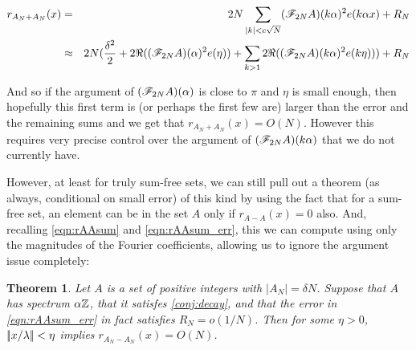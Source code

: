 \documentclass{report}
\newtheorem{theorem}{Theorem}[section]
\theoremstyle{remark}
\numberwithin{equation}{section}
\begin{document}
\begin{eqnarray*}
  r_{A_N + A_N}(x) &=& 2N \sum_{|k| < c\sqrt{N}}
                       (\mathscr{F}_{2N}A)(k\alpha)^2 e(k\alpha x) + R_N\\
                   &\approx& 2N (\frac{\delta^2}{2} +
                             2\Re((\mathscr{F}_{2N}A)(\alpha)^2 e(\eta)) + \sum_{k > 1}
                             2\Re((\mathscr{F}_{2N}A)(k\alpha)^2 e(k\eta))) + R_N\\
\end{eqnarray*}

And so if the argument of $(\mathscr{F}_{2N}A)(\alpha)$ is close to $\pi$ and
$\eta$ is small enough, then hopefully this first term is (or perhaps
the first few are) larger than the error and the remaining sums and we
get that $r_{A_N + A_N}(x) = O(N)$.  However this requires very
precise control over the argument of $(\mathscr{F}_{2N}A)(k\alpha)$ that we
do not currently have.

However, at least for truly sum-free sets, we can still pull out a
theorem (as always, conditional on small error) of this kind by using
the fact that for a sum-free set, an element can be in the set $A$
only if $r_{A-A}(x) = 0$ also.  And, recalling \ref{eqn:rAAsum} and
\ref{eqn:rAAsum_err}, this we can compute using only the magnitudes of
the Fourier coefficients, allowing us to ignore the argument issue
completely: 

\begin{theorem}\label{thm:hole1}
  Let $A$ is a \relevant set of positive integers with
  $|A_N| = \delta N$.  Suppose that $A$ has spectrum $\alpha\mathbb{Z}$, that
  it satisfes \ref{conj:decay}, and that the error in
  \ref{eqn:rAAsum_err} in fact satisfies $R_N = o(1/N)$.  Then for
  some $\eta > 0$, $|\!|x/\lambda|\!| < \eta$ implies
  $r_{A_N-A_N}(x) = O(N)$.
\end{theorem}
\end{document}
